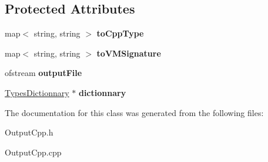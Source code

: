 \subsection*{\-Protected \-Attributes}
\begin{DoxyCompactItemize}
\item 
\hypertarget{classnsJNI_1_1OutputCpp_a7c5fe2308935b06b5aa6df774c1bf833}{map$<$ string, string $>$ {\bfseries to\-Cpp\-Type}}\label{classnsJNI_1_1OutputCpp_a7c5fe2308935b06b5aa6df774c1bf833}

\item 
\hypertarget{classnsJNI_1_1OutputCpp_a06ddb53e43b9e28b661aafd75d9d5e1e}{map$<$ string, string $>$ {\bfseries to\-V\-M\-Signature}}\label{classnsJNI_1_1OutputCpp_a06ddb53e43b9e28b661aafd75d9d5e1e}

\item 
\hypertarget{classnsJNI_1_1OutputCpp_a172407dc2cfef858c685b95f2dafb436}{ofstream {\bfseries output\-File}}\label{classnsJNI_1_1OutputCpp_a172407dc2cfef858c685b95f2dafb436}

\item 
\hypertarget{classnsJNI_1_1OutputCpp_adf088a0b2c2925bb0a980b3d242fca81}{\hyperlink{classnsJNI_1_1TypesDictionnary}{\-Types\-Dictionnary} $\ast$ {\bfseries dictionnary}}\label{classnsJNI_1_1OutputCpp_adf088a0b2c2925bb0a980b3d242fca81}

\end{DoxyCompactItemize}


\-The documentation for this class was generated from the following files\-:\begin{DoxyCompactItemize}
\item 
\-Output\-Cpp.\-h\item 
\-Output\-Cpp.\-cpp\end{DoxyCompactItemize}

